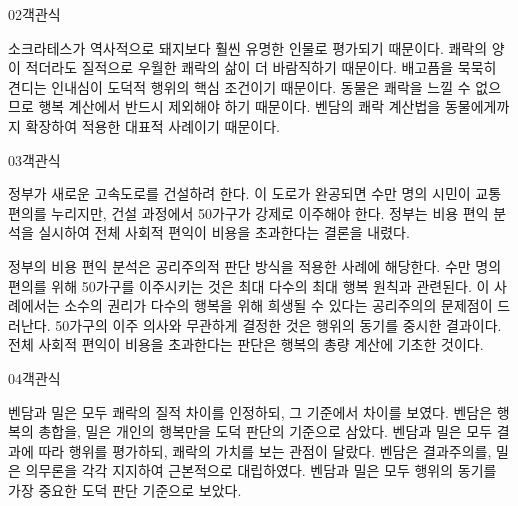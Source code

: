 \documentclass[fs85,seriesWit]{korfarm-base}
\begin{document}
\begin{kfQBlock}{02}{객관식}
\begin{kfChoices}
\kfChoice 소크라테스가 역사적으로 돼지보다 훨씬 유명한 인물로 평가되기 때문이다.
\kfChoice 쾌락의 양이 적더라도 질적으로 우월한 쾌락의 삶이 더 바람직하기 때문이다.
\kfChoice 배고픔을 묵묵히 견디는 인내심이 도덕적 행위의 핵심 조건이기 때문이다.
\kfChoice 동물은 쾌락을 느낄 수 없으므로 행복 계산에서 반드시 제외해야 하기 때문이다.
\kfChoice 벤담의 쾌락 계산법을 동물에게까지 확장하여 적용한 대표적 사례이기 때문이다.
\end{kfChoices}
\end{kfQBlock}

\begin{kfQBlock}{03}{객관식}
\begin{kfEvidence}정부가 새로운 고속도로를 건설하려 한다. 이 도로가 완공되면 수만 명의 시민이 교통 편의를 누리지만, 건설 과정에서 50가구가 강제로 이주해야 한다. 정부는 비용 편익 분석을 실시하여 전체 사회적 편익이 비용을 초과한다는 결론을 내렸다.\end{kfEvidence}
\begin{kfChoices}
\kfChoice 정부의 비용 편익 분석은 공리주의적 판단 방식을 적용한 사례에 해당한다.
\kfChoice 수만 명의 편의를 위해 50가구를 이주시키는 것은 최대 다수의 최대 행복 원칙과 관련된다.
\kfChoice 이 사례에서는 소수의 권리가 다수의 행복을 위해 희생될 수 있다는 공리주의의 문제점이 드러난다.
\kfChoice 50가구의 이주 의사와 무관하게 결정한 것은 행위의 동기를 중시한 결과이다.
\kfChoice 전체 사회적 편익이 비용을 초과한다는 판단은 행복의 총량 계산에 기초한 것이다.
\end{kfChoices}
\end{kfQBlock}

\begin{kfQBlock}{04}{객관식}
\begin{kfChoices}
\kfChoice 벤담과 밀은 모두 쾌락의 질적 차이를 인정하되, 그 기준에서 차이를 보였다.
\kfChoice 벤담은 행복의 총합을, 밀은 개인의 행복만을 도덕 판단의 기준으로 삼았다.
\kfChoice 벤담과 밀은 모두 결과에 따라 행위를 평가하되, 쾌락의 가치를 보는 관점이 달랐다.
\kfChoice 벤담은 결과주의를, 밀은 의무론을 각각 지지하여 근본적으로 대립하였다.
\kfChoice 벤담과 밀은 모두 행위의 동기를 가장 중요한 도덕 판단 기준으로 보았다.
\end{kfChoices}
\end{kfQBlock}
\end{document}
